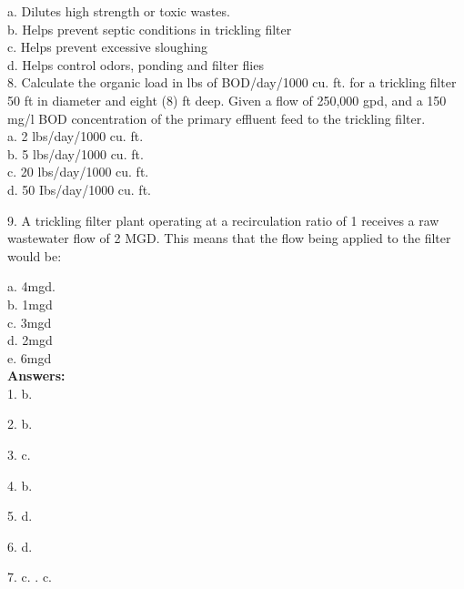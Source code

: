 a. Dilutes high strength or toxic wastes. \\
b. Helps prevent septic conditions in trickling filter \\
c. Helps prevent excessive sloughing \\
d. Helps control odors, ponding and filter flies \\

\vspace{0.3cm}
8. Calculate the organic load in lbs of BOD/day/1000 cu. ft. for a trickling filter 50 ft in diameter and eight (8) ft deep. Given a flow of 250,000 gpd, and a 150 mg/l BOD concentration of the primary effluent feed to the trickling filter.\\

a. 2 lbs/day/1000 cu. ft. \\
b. 5 lbs/day/1000 cu. ft. \\
c. 20 lbs/day/1000 cu. ft. \\
d. 50 Ibs/day/1000 cu. ft. \\
\vspace{0.3cm}

9. A trickling filter plant operating at a recirculation ratio of 1 receives a raw wastewater flow of 2 MGD. This means that the flow being applied to the filter would be:

a. 4mgd. \\
b. 1mgd \\
c. 3mgd \\
d. 2mgd \\
e. 6mgd \\


\vspace{1cm}
\textbf{Answers:}\\
1.	b.  

\vspace{0.3cm}
2.	b.  

\vspace{0.3cm}
3.	c.  
\vspace{0.3cm}

4.	b.  

\vspace{0.3cm}
5.	d.  

\vspace{0.3cm}
6.	d.  
\vspace{0.3cm}

7.	c.  
\vspace{0.3cm}
.	c.  

\vspace{0.3cm}

